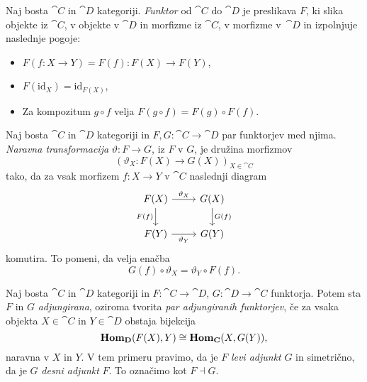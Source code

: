 \documentclass[../kategoricna_logika.tex]{subfiles}
\begin{document}
\begin{definicija}
  Naj bosta $\cat{C}$ in $\cat{D}$ kategoriji. \emph{Funktor} od $\cat{C}$ do $\cat{D}$
  je preslikava $F$, ki slika objekte iz $\cat{C}$, v objekte v $\cat{D}$ in morfizme iz
  $\cat{C}$, v morfizme v~$\cat{D}$ in izpolnjuje naslednje pogoje:
  \begin{itemize}
  \item $F(f : X \to Y) = F(f) : F(X) \to F(Y)$,
\item $F(\mathrm{id}_X) = \mathrm{id}_{F(X)}$,
\item Za kompozitum $g \circ f$ velja $F(g \circ f) = F(g) \circ F(f)$.
  \end{itemize}
\end{definicija}
\begin{definicija}
  Naj bosta $\cat{C}$ in $\cat{D}$ kategoriji in $F,G : \cat{C} \to \cat{D}$ par funktorjev
  med njima. \emph{Naravna transformacija} $\vartheta : F \to G$, iz $F$ v $G$, je
  družina morfizmov
  \[ (\vartheta_X : F(X) \to G(X))_{X \in \cat{C}}\]
  tako, da za vsak morfizem $f : X \to Y$ v $\cat{C}$ naslednji diagram
  \begin{equation*}
    \begin{tikzcd}
      F(X) \ar[d, "F(f)"'] \ar[r, "\vartheta_X"] & G(X) \ar[d, "G(f)"] \\
      F(Y) \ar[r, "\vartheta_Y"'] & G(Y)
    \end{tikzcd}
  \end{equation*}
  komutira. To pomeni, da velja enačba
  \[ G(f) \circ \vartheta_X = \vartheta_Y \circ F(f).\]
\end{definicija}
\begin{definicija}
  Naj bosta $\cat{C}$ in $\cat{D}$ kategoriji in $F : \cat{C} \to \cat{D}$, $G : \cat{D} \to \cat{C}$
  funktorja. Potem sta $F$ in $G$ \emph{adjungirana}, oziroma tvorita
  \emph{par adjungiranih funktorjev}, če za vsaka objekta $X \in \cat{C}$ in $Y \in \cat{D}$
  obstaja bijekcija
  \[ \mathbf{Hom}_{{\operatorname{\mathbf{D}}}}(F(X), Y) \cong \mathbf{Hom}_{{\operatorname{\mathbf{C}}}}(X, G(Y)),\]
  naravna v $X$ in $Y$.
  V tem primeru pravimo, da je $F$ \emph{levi adjunkt} $G$ in simetrično, da je $G$
  \emph{desni adjunkt} $F$. To označimo kot $F \dashv G$.
\end{definicija}
\end{document}
